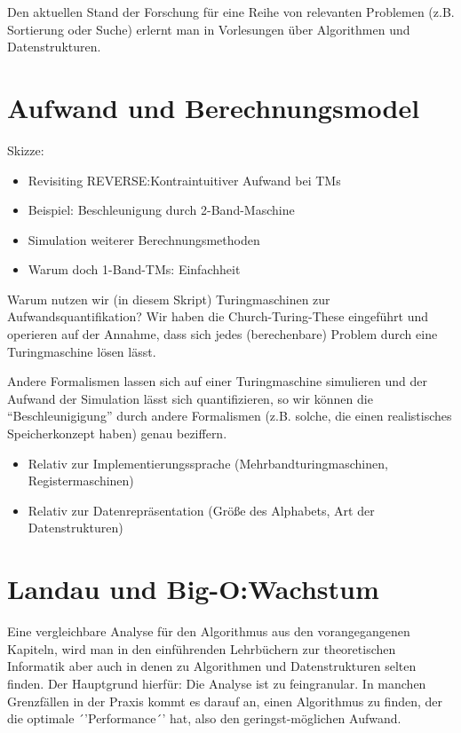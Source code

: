 Den aktuellen Stand der Forschung für eine Reihe von relevanten Problemen
(z.B. Sortierung oder Suche) erlernt man in Vorlesungen über
Algorithmen und Datenstrukturen.



\section{Aufwand und Berechnungsmodel}
Skizze:
\begin{itemize}
        \item Revisiting REVERSE:\@ Kontraintuitiver Aufwand bei TMs
        \item Beispiel: Beschleunigung durch 2-Band-Maschine
        \item Simulation weiterer Berechnungsmethoden
        \item Warum doch 1-Band-TMs: Einfachheit
\end{itemize}

Warum nutzen wir (in diesem Skript) Turingmaschinen zur Aufwandsquantifikation?
Wir haben die Church-Turing-These eingeführt und operieren auf der Annahme,
dass sich jedes (berechenbare) Problem durch eine Turingmaschine lösen lässt.

Andere Formalismen lassen sich auf einer Turingmaschine simulieren und
der Aufwand der Simulation lässt sich quantifizieren,
so wir können die ``Beschleunigigung'' durch andere Formalismen
(z.B. solche, die einen realistisches Speicherkonzept haben)
genau beziffern.

\begin{itemize}
    \item Relativ zur Implementierungssprache (Mehrbandturingmaschinen, Registermaschinen)
    \item Relativ zur Datenrepräsentation (Größe des Alphabets, Art der Datenstrukturen)
\end{itemize}

\section{Landau und Big-O:\@ Wachstum}

Eine vergleichbare Analyse für den Algorithmus aus den vorangegangenen Kapiteln,
wird man in den einführenden Lehrbüchern zur theoretischen Informatik
aber auch in denen zu Algorithmen und Datenstrukturen selten finden.
Der Hauptgrund hierfür: Die Analyse ist zu feingranular.
In manchen Grenzfällen in der Praxis kommt es darauf an,
einen Algorithmus zu finden, der die optimale ´'Performance´' hat,
also den geringst-möglichen Aufwand.

